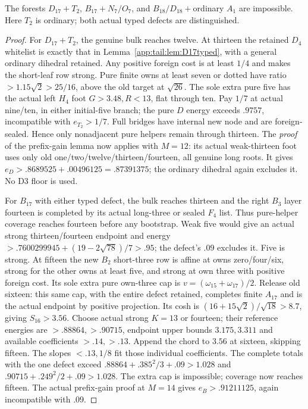 \begin{lemma}
\label{app:tail:lem:proper19standard}
The forests $D_{17}+T_2$, $B_{17}+N_7/O_7$, and
$B_{18}/D_{18}+$ordinary $A_1$ are impossible. Here $T_2$
is ordinary; both actual typed defects are distinguished.
\end{lemma}
\begin{proof}
For $D_{17}+T_2$, the genuine bulk reaches twelve.
At thirteen the retained $D_4$ whitelist is exactly that in
Lemma~\ref{app:tail:lem:D17typed}, with a general ordinary
dihedral retained. Any positive foreign cost is at least $1/4$
and makes the short-leaf row strong. Pure finite owns at least
seven or dotted have ratio $>1.15\sqrt2>25/16$, above the
old target at $\sqrt{26}$.
The sole extra pure five has the actual left $H_4$ foot
$G>3.48,R<13$, flat through ten.
Pay $1/7$ at actual nine/ten, in either initial-five branch;
the pure $D$ energy exceeds $.9757$, incompatible with
$e_{T_2}>1/7$. Full bridges have internal new node and are
foreign-sealed. Hence only nonadjacent pure helpers remain
through thirteen. The \emph{proof} of the prefix-gain lemma
now applies with $M=12$: its actual weak-thirteen foot uses
only old one/two/twelve/thirteen/fourteen, all genuine long
roots. It gives $e_D>.8689525+.00496125=.87391375$;
the ordinary dihedral again excludes it. No D3 floor is used.

For $B_{17}$ with either typed defect, the bulk reaches thirteen
and the right $B_3$ layer fourteen is completed by its actual
long-three or sealed $F_4$ list. Thus pure-helper coverage
reaches fourteen before any bootstrap.
Weak five would give an actual strong thirteen/fourteen
endpoint and energy
$>.7600299945+(19-2\sqrt{78})/7>.95$;
the defect's $.09$ excludes it. Five is strong.
At fifteen the new $B_2$ short-three row is affine at
owns zero/four/six, strong for the other owns at least five,
and strong at own three with positive foreign cost.
Its sole extra pure own-three cap is
$v=(\omega_{15}+\omega_{17})/2$.
Release old sixteen: this same cap, with the entire defect
retained, completes finite $A_{17}$ and is the actual endpoint
by positive projection. Its cosh is
$(16+15\sqrt2)/\sqrt{18}>8.7$, giving $S_{16}>3.56$.
Choose actual strong $K=13$ or fourteen; their reference
energies are $>.88864,>.90715$, endpoint upper bounds
$3.175,3.311$ and available coefficients $>.14,>.13$.
Append the chord to $3.56$ at sixteen, skipping fifteen.
The slopes $<.13,1/8$ fit those individual coefficients.
The complete totals with the one defect exceed
$ .88864+.385^2/3+.09>1.028$ and
$ .90715+.249^2/2+.09>1.028$.
The extra cap is impossible; coverage now reaches fifteen.
The actual prefix-gain proof at $M=14$ gives
$e_B>.91211125$, again incompatible with $.09$.


\end{proof}
